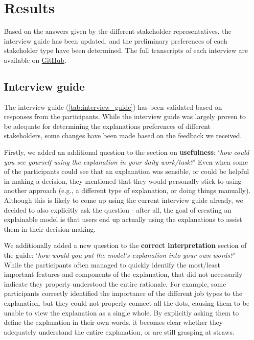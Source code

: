 \section{Results}
Based on the answers given by the different stakeholder representatives, the interview guide has been updated, and the preliminary preferences of each stakeholder type have been determined. The full transcripts of each interview are available on \href{https://anonymous.4open.science/r/JRS_explanations-84D6/}{GitHub}. 

\subsection{Interview guide}

The interview guide (\cref{tab:interview_guide}) has been validated based on responses from the participants. While the interview guide was largely proven to be adequate for determining the explanations preferences of different stakeholders, some changes have been made based on the feedback we received. 

Firstly, we added an additional question to the section on \textbf{usefulness}: `\textit{how could you see yourself using the explanation in your daily work/task?}' Even when some of the participants could see that an explanation was sensible, or could be helpful in making a decision, they mentioned that they would personally stick to using another approach (e.g., a different type of explanation, or doing things manually). Although this is likely to come up using the current interview guide already, we decided to also explicitly ask the question - after all, the goal of creating an explainable model is that users end up actually using the explanations to assist them in their decision-making. 

We additionally added a new question to the \textbf{correct interpretation} section of the guide: `\textit{how would you put the model's explanation into your own words?}' While the participants often managed to quickly identify the most/least important features and components of the explanation, that did not necessarily indicate they properly understood the entire rationale. For example, some participants correctly identified the importance of the different job types to the explanation, but they could not properly connect all the dots, causing them to be unable to view the explanation as a single whole. By explicitly asking them to define the explanation in their own words, it becomes clear whether they adequately understand the entire explanation, or are still grasping at straws. 


